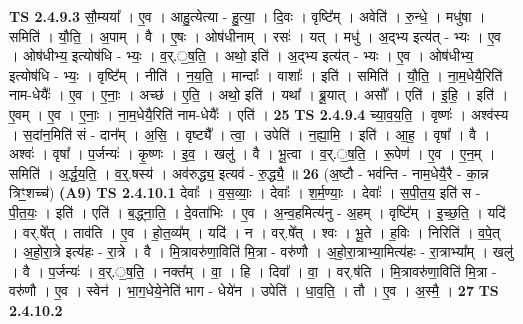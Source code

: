 \documentclass[17pt]{extarticle}
\begin{document}
                  \newline
                                \textbf{ TS 2.4.9.3} \newline
                  सौ॒म्यया᳚ । ए॒व । आहु॒त्येत्या - हु॒त्या॒ । दि॒वः । वृष्टि᳚म् । अवेति॑ । रु॒न्धे॒ । मधु॑षा । समिति॑ । यौ॒ति॒ । अ॒पाम् । वै । ए॒षः । ओष॑धीनाम् । रसः॑ । यत् । मधु॑ । अ॒द्भ्य इत्य॑त् - भ्यः । ए॒व । ओष॑धीभ्य॒ इत्योष॑धि - भ्यः॒ । व॒र्.॒ष॒ति॒ । अथो॒ इति॑ । अ॒द्भ्य इत्य॑त् - भ्यः । ए॒व । ओष॑धीभ्य॒ इत्योष॑धि - भ्यः॒ । वृष्टि᳚म् । नीति॑ । न॒य॒ति॒ । मान्दाः᳚ । वाशाः᳚ । इति॑ । समिति॑ । यौ॒ति॒ । ना॒म॒धेयै॒रिति॑ नाम-धेयैः᳚ । ए॒व । ए॒नाः॒ । अच्छ॑ । ए॒ति॒ । अथो॒ इति॑ । यथा᳚ । ब्रू॒यात् । असौ᳚ ।   एति॑ । इ॒हि॒ । इति॑ । ए॒वम् । ए॒व । ए॒नाः॒ । ना॒म॒धेयै॒रिति॑ नाम-धेयैः᳚ । एति॑ । \textbf{  25} \newline
                  \newline
                                \textbf{ TS 2.4.9.4} \newline
                  च्या॒व॒य॒ति॒ । वृष्णः॑ । अश्व॑स्य । स॒दांन॒मिति॑ सं - दान᳚म् । अ॒सि॒ । वृष्ट्यै᳚ । त्वा॒ । उपेति॑ । न॒ह्या॒मि॒ । इति॑ । आ॒ह॒ । वृषा᳚ । वै । अश्वः॑ । वृषा᳚ । प॒र्जन्यः॑ । कृ॒ष्णः । इ॒व॒ । खलु॑ । वै । भू॒त्वा । व॒र्.॒ष॒ति॒ । रू॒पेण॑ । ए॒व । ए॒न॒म् । समिति॑ । अ॒र्द्ध॒य॒ति॒ । व॒र्॒.षस्य॑ । अव॑रुद्ध्य॒ इत्यव॑ - रु॒द्ध्यै॒ ॥ \textbf{  26} \newline
                  \newline
                      (अ॒ष्टौ - भव॑न्ति - नाम॒धेयै॒रै - का॒न्न त्रिꣳ॒॒शच्च॑)  \textbf{(A9)} \newline \newline
                                \textbf{ TS 2.4.10.1} \newline
                  देवाः᳚ । व॒स॒व्याः॒ । देवाः᳚ । श॒र्म॒ण्याः॒ । देवाः᳚ । स॒पी॒त॒य॒ इति॑ स - पी॒त॒यः॒ । इति॑ । एति॑ । ब॒द्ध्ना॒ति॒ । दे॒वता॑भिः । ए॒व । अ॒न्व॒हमित्य॑नु - अ॒हम् । वृष्टि᳚म् । इ॒च्छ॒ति॒ । यदि॑ । वर्.षे᳚त् । ताव॑ति । ए॒व । हो॒त॒व्य᳚म् । यदि॑ । न । वर्.षे᳚त् । श्वः । भू॒ते । ह॒विः । निरिति॑ । व॒पे॒त् । अ॒हो॒रा॒त्रे इत्य॑हः - रा॒त्रे । वै । मि॒त्रावरु॑णा॒विति॑ मि॒त्रा - वरु॑णौ । अ॒हो॒रा॒त्राभ्या॒मित्य॑हः - रा॒त्राभ्या᳚म् । खलु॑ । वै । प॒र्जन्यः॑ । व॒र्.॒ष॒ति॒ । नक्त᳚म् । वा॒ । हि । दिवा᳚ । वा॒ । वर्.ष॑ति । मि॒त्रावरु॑णा॒विति॑ मि॒त्रा - वरु॑णौ । ए॒व । स्वेन॑ । भा॒ग॒धेये॒नेति॑ भाग - धेये॑न । उपेति॑ । धा॒व॒ति॒ । तौ । ए॒व । अ॒स्मै॒ । \textbf{  27} \newline
                  \newline
                                \textbf{ TS 2.4.10.2} \newline
\end{document}
